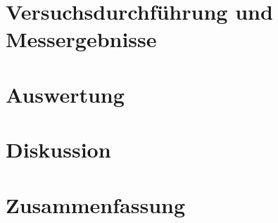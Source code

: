 \documentclass[ngerman]{scrartcl}
\begin{document}
\section{Versuchsdurchführung und Messergebnisse}
\label{sec:versuchsdurchfuehrung_messergebnisse}



\section{Auswertung}
\label{sec:auswertung}



\section{Diskussion}
\label{sec:diskussion}



\section{Zusammenfassung}
\label{sec:zusammenfassung}



\clearpage
\printbibliography

\listoffigures

\listoftables
\end{document}
